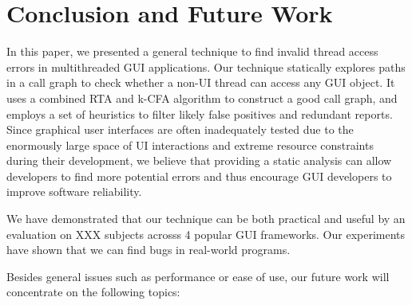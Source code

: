 \section{Conclusion and Future Work}

In this paper, we presented a general technique to find invalid
thread access errors in multithreaded GUI applications. 
Our technique statically explores paths in a call graph to check
whether a non-UI thread can access any GUI object.
It uses a combined RTA and k-CFA algorithm to construct
a good call graph, and employs a set of heuristics to
filter likely false positives and redundant reports.
Since graphical user interfaces are often inadequately tested due
to the enormously large space of UI interactions and
extreme resource constraints during their development, we
believe that providing a static analysis can allow developers to find
more potential errors %
and thus encourage GUI developers to improve software reliability.

We have demonstrated that our technique can be both practical and useful
by an evaluation on XXX subjects acrosss 4 popular GUI
frameworks. Our experiments have shown that we can find bugs
in real-world programs.


Besides general issues such as performance or ease of use, our future
work will concentrate on the following topics:

